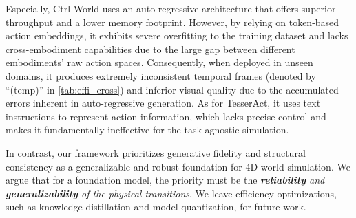 \begin{appendices}
Especially, Ctrl-World uses an auto-regressive architecture that offers superior throughput and a lower memory footprint. However, by relying on token-based action embeddings, it exhibits severe overfitting to the training dataset and lacks cross-embodiment capabilities due to the large gap between different embodiments' raw action spaces. Consequently, when deployed in unseen domains, it produces extremely inconsistent temporal frames (denoted by “(temp)” in \cref{tab:effi_cross}) and inferior visual quality due to the accumulated errors inherent in auto-regressive generation. As for TesserAct, it uses text instructions to represent action information, which lacks precise control and makes it fundamentally ineffective for the task-agnostic simulation.

In contrast, our framework prioritizes generative fidelity and structural consistency as a generalizable and robust foundation for 4D world simulation. We argue that for a foundation model, the priority must be the \textit{\textbf{reliability} and \textbf{generalizability} of the physical transitions}. We leave efficiency optimizations, such as knowledge distillation and model quantization, for future work.

\begin{table}[t]
\centering
\setlength{\tabcolsep}{6pt}
\caption{Comparison of the efficiency and cross-domain transfer. While the baseline methods offer better efficiency, their generalization abilities are extremely worse than our method, considering both the actual quality and the self-temporal consistency.}
\label{tab:effi_cross}
\end{table}


\end{appendices}
